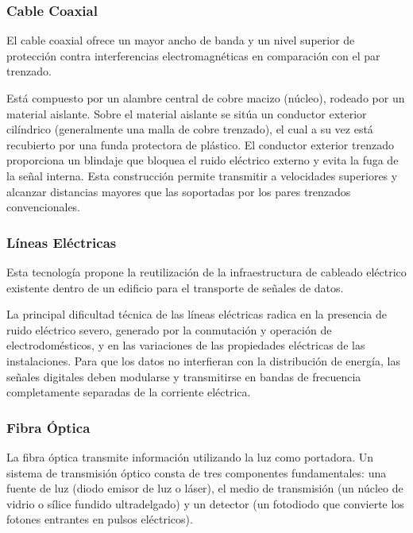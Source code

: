 \subsubsection{Cable Coaxial}

El cable coaxial ofrece un mayor ancho de banda y un nivel superior de protección contra interferencias electromagnéticas en comparación con el par trenzado. 

Está compuesto por un alambre central de cobre macizo (núcleo), rodeado por un material aislante. Sobre el material aislante se sitúa un conductor exterior cilíndrico (generalmente una malla de cobre trenzado), el cual a su vez está recubierto por una funda protectora de plástico. El conductor exterior trenzado proporciona un blindaje que bloquea el ruido eléctrico externo y evita la fuga de la señal interna. Esta construcción permite transmitir a velocidades superiores y alcanzar distancias mayores que las soportadas por los pares trenzados convencionales.

\subsubsection{Líneas Eléctricas}

Esta tecnología propone la reutilización de la infraestructura de cableado eléctrico existente dentro de un edificio para el transporte de señales de datos. 

La principal dificultad técnica de las líneas eléctricas radica en la presencia de ruido eléctrico severo, generado por la conmutación y operación de electrodomésticos, y en las variaciones de las propiedades eléctricas de las instalaciones. Para que los datos no interfieran con la distribución de energía, las señales digitales deben modularse y transmitirse en bandas de frecuencia completamente separadas de la corriente eléctrica.

\subsubsection{Fibra Óptica}

La fibra óptica transmite información utilizando la luz como portadora. Un sistema de transmisión óptico consta de tres componentes fundamentales: una fuente de luz (diodo emisor de luz o láser), el medio de transmisión (un núcleo de vidrio o sílice fundido ultradelgado) y un detector (un fotodiodo que convierte los fotones entrantes en pulsos eléctricos).

